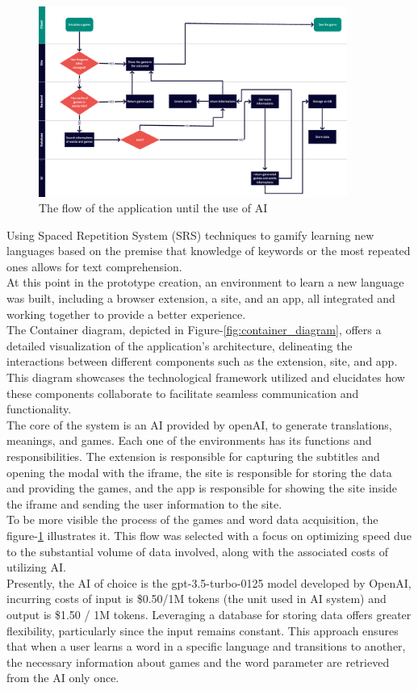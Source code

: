 \documentclass[12pt]{article}
\begin{document}
\begin{figure}[!h]
  \centering
  \caption{
    The flow of the application until the use of AI
  }
  \label{fig:flow_diagram}
  \includegraphics[width=0.9\textwidth]{assets/26.png}
\end{figure}
Using Spaced Repetition System (SRS) techniques to gamify learning new languages based on the premise that knowledge of keywords or the most repeated ones allows for text comprehension. \\
At this point in the prototype creation, an environment to learn a new language was built, including a browser extension, a site, and an app, all integrated and working together to provide a better experience. \\
The Container diagram, depicted in Figure-\ref{fig:container_diagram}, offers a detailed visualization of the application's architecture, delineating the interactions between different components such as the extension, site, and app. This diagram showcases the technological framework utilized and elucidates how these components collaborate to facilitate seamless communication and functionality. \\
The core of the system is an AI provided by openAI, to generate translations, meanings, and games. Each one of the environments has its functions and responsibilities. The extension is responsible for capturing the subtitles and opening the modal with the iframe, the site is responsible for storing the data and providing the games, and the app is responsible for showing the site inside the iframe and sending the user information to the site. \\
To be more visible the process of the games and word data acquisition, the figure-\ref{fig:flow_diagram} illustrates it. This flow was selected with a focus on optimizing speed due to the substantial volume of data involved, along with the associated costs of utilizing AI. \\
Presently, the AI of choice is the gpt-3.5-turbo-0125 model developed by OpenAI, incurring costs of input is \$0.50/1M tokens (the unit used in AI system) and output is  \$1.50 / 1M tokens. Leveraging a database for storing data offers greater flexibility, particularly since the input remains constant. This approach ensures that when a user learns a word in a specific language and transitions to another, the necessary information about games and the word parameter are retrieved from the AI only once. 
\end{document}
